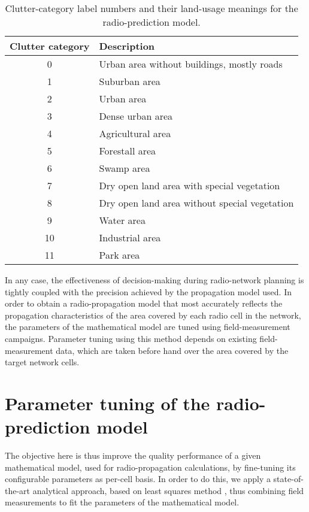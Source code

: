 \begin{table}
\caption{Clutter-category label numbers and their land-usage meanings for the
radio-prediction model. \label{tab:Clutter-categories}}


{\footnotesize \centering}{\footnotesize \par}

{\footnotesize }%
\begin{tabular}{cl}
\hline 
{\footnotesize Clutter category} & {\footnotesize Description}\tabularnewline
\hline 
{\footnotesize 0} & {\footnotesize Urban area without buildings, mostly roads}\tabularnewline
{\footnotesize 1} & {\footnotesize Suburban area }\tabularnewline
{\footnotesize 2} & {\footnotesize Urban area}\tabularnewline
{\footnotesize 3} & {\footnotesize Dense urban area}\tabularnewline
{\footnotesize 4} & {\footnotesize Agricultural area}\tabularnewline
{\footnotesize 5} & {\footnotesize Forestall area}\tabularnewline
{\footnotesize 6} & {\footnotesize Swamp area}\tabularnewline
{\footnotesize 7} & {\footnotesize Dry open land area with special vegetation}\tabularnewline
{\footnotesize 8} & {\footnotesize Dry open land area without special vegetation}\tabularnewline
{\footnotesize 9} & {\footnotesize Water area}\tabularnewline
{\footnotesize 10} & {\footnotesize Industrial area}\tabularnewline
{\footnotesize 11 } & {\footnotesize Park area}\tabularnewline
\hline 
\end{tabular}
\end{table}


In any case, the effectiveness of decision-making during radio-network
planning is tightly coupled with the precision achieved by the propagation
model used. In order to obtain a radio-propagation model that most
accurately reflects the propagation characteristics of the area covered
by each radio cell in the network, the parameters of the mathematical
model are tuned using field-measurement campaigns. Parameter tuning
using this method depends on existing field-measurement data, which
are taken before hand over the area covered by the target network
cells.


\section{Parameter tuning of the radio-prediction model}\label{sec:Parameter-tuning}

The objective here is thus improve the quality performance of a given
mathematical model, used for radio-propagation calculations, by fine-tuning
its configurable parameters as per-cell basis. In order to do this,
we apply a state-of-the-art analytical approach, based on least squares
method \cite{Yang_A_linear_least_square_method_of_propagation_model_tuning_for_3G_radion_network_planning:2008},
thus combining field measurements to fit the parameters of the mathematical
model.

